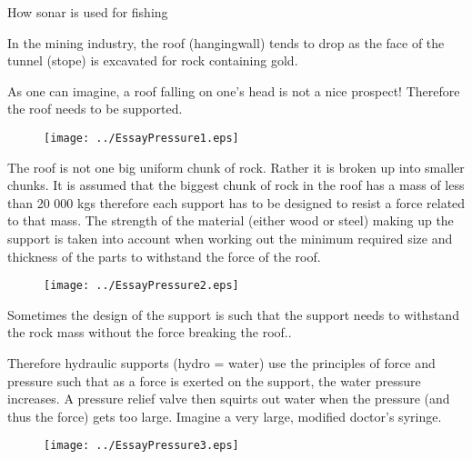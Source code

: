 How sonar is used for fishing







In the mining industry, the roof (hangingwall) tends to drop as the
face of the tunnel (stope) is excavated for rock containing gold.

As one can imagine, a roof falling on one's head is not a nice
prospect! Therefore the roof needs to be supported.
\begin{figure}[H]
\centering
\texttt{[image: ../EssayPressure1.eps]}
\end{figure}

The roof is not one big uniform chunk of rock. Rather it is broken
up into smaller chunks. It is assumed that the biggest chunk of rock
in the roof has a mass of less than 20 000 kgs therefore each
support has to be designed to resist a force related to that mass.
The strength of the material (either wood or steel) making up the
support is taken into account when working out the minimum required
size and thickness of the parts to withstand the force of the roof.

\begin{figure}[H]
\centering
\texttt{[image: ../EssayPressure2.eps]}
\end{figure}


Sometimes the design of the support is such that the support needs
to withstand the rock mass without the force breaking the roof..

Therefore hydraulic supports (hydro = water) use the principles of
force and pressure such that as a force is exerted on the support,
the water pressure increases. A pressure relief valve then squirts
out water when the pressure (and thus the force) gets too large.
Imagine a very large, modified doctor's syringe.
\begin{figure}[H]
\centering
\texttt{[image: ../EssayPressure3.eps]}
\end{figure}

